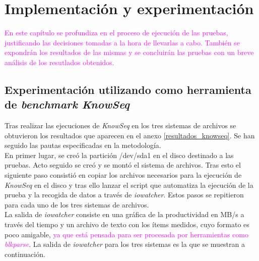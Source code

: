 \cleardoublepage

\chapter[Implementación y experimentación]{Implementación y experimentación}

\textcolor{magenta}{En este capítulo se profundiza en el proceso de ejecución de las pruebas, justificando las decisiones tomadas a la hora de llevarlas a cabo. También se expondrán los resultados de las mismas y se concluirán las pruebas con un breve análisis de los resutlados obtenidos.}

\section{Experimentación utilizando como herramienta de  \textit{benchmark KnowSeq}} %
Tras realizar las ejecuciones de \textit{KnowSeq} en los tres sistemas de archivos se obtuvieron los resultados que aparecen en el anexo \ref{resultados_knowseq}. Se han seguido las pautas especificadas en la metodología. \\

En primer lugar, se creó la partición /dev/sda1 en el disco destinado a las pruebas. Acto seguido se creó y se montó el sistema de archivos. Tras esto el siguiente paso consistió en copiar los archivos necesarios para la ejecución de \textit{KnowSeq} en el disco y tras ello lanzar el script que automatiza la ejecución de la prueba y la recogida de datos a través de \textit{iowatcher}. Estos pasos se repitieron para cada uno de los tres sistemas de archivos.\\

La salida de \textit{iowatcher} consiste en una gráfica de la productividad en MB/s a través del tiempo y un archivo de texto con los ítems medidos, cuyo formato es poco amigable, \textcolor{magenta}{ ya que está pensada para ser procesada por herramientas como \textit{blkparse}}. La salida de \textit{iowatcher} para los tres sistemas es la que se muestran a continuación.\\ 

